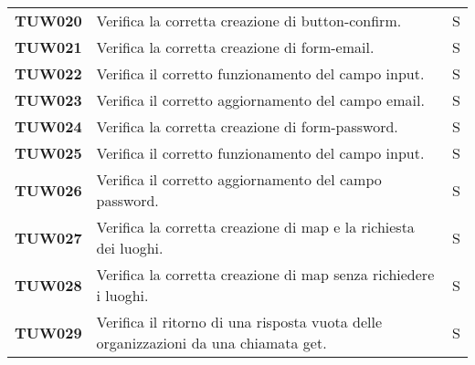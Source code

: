 \documentclass[../../piano-di-qualifica.tex]{subfiles}
\begin{document}
\begin{longtable}[H]{>{\centering\bfseries}m{3cm} >{}m{10cm} >{\centering\arraybackslash}m{3cm}}

  TUW020             & Verifica la corretta creazione di button-confirm.                                                                   & S                             \\


  TUW021             & Verifica la corretta creazione di form-email.                                                                       & S                             \\

  TUW022             & Verifica il corretto funzionamento del campo input.                                                                 & S                             \\

  TUW023             & Verifica il corretto aggiornamento del campo email.                                                                 & S                             \\


  TUW024             & Verifica la corretta creazione di form-password.                                                                    & S                             \\

  TUW025             & Verifica il corretto funzionamento del campo input.                                                                 & S                             \\

  TUW026             & Verifica il corretto aggiornamento del campo password.                                                              & S                             \\


  TUW027             & Verifica la corretta creazione di map e la richiesta dei luoghi.                                                    & S                             \\

  TUW028             & Verifica la corretta creazione di map senza richiedere i luoghi.                                                    & S                             \\

  TUW029             & Verifica il ritorno di una risposta vuota delle organizzazioni da una chiamata get.                                 & S                             \\


\end{longtable}
\end{document}
